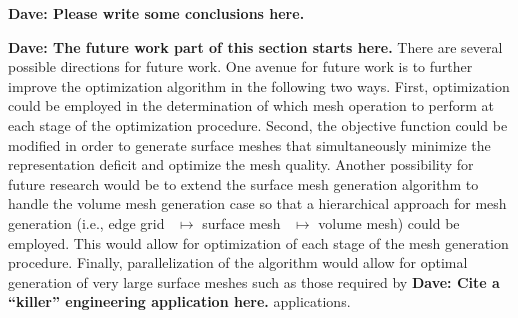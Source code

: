 {\bf{Dave:  Please write some conclusions here.}}

{\bf{Dave:  The future work part of this section starts here.}} There are 
several possible directions for future work.  One avenue for future work 
is to further improve the optimization algorithm in the following two 
ways.  First, optimization could be employed in the determination of which 
mesh operation to perform at each stage of the optimization procedure.  
Second, the objective function could be modified in order to generate 
surface meshes that simultaneously minimize the representation deficit and 
optimize the mesh quality.  Another possibility for future research would 
be to extend the surface mesh generation algorithm to handle the volume 
mesh generation case so that a hierarchical approach for mesh generation 
(i.e., edge grid~\cite{mclaurin13} $\mapsto$ surface 
mesh~\cite{mclaurin14} $\mapsto$ volume mesh) could be employed. This 
would allow for optimization of each stage of the mesh generation 
procedure.  Finally, parallelization of the algorithm would allow for 
optimal generation of very large surface meshes such as those required by 
{\bf{Dave:  Cite a ``killer'' engineering application here.}} 
applications.
